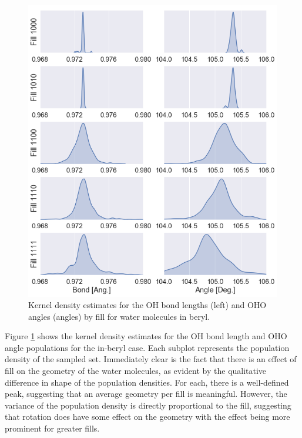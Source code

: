         \begin{figure}
            \centering
            \includegraphics[width=0.85\linewidth]{Figures/System/geom_kdes.png}
            \caption{Kernel density estimates for the OH bond lengths (left) and OHO angles (angles) by fill for water molecules in beryl. }
            \label{fig:geom_kdes}
        \end{figure}
        
        Figure \ref{fig:geom_kdes} shows the kernel density estimates for the OH bond length and OHO angle populations for the in-beryl case. Each subplot represents the population density of the sampled set. Immediately clear is the fact that there is an effect of fill on the geometry of the water molecules, as evident by the qualitative difference in shape of the population densities. For each, there is a well-defined peak, suggesting that an average geometry per fill is meaningful. However, the variance of the population density is directly proportional to the fill, suggesting that rotation does have some effect on the geometry with the effect being more prominent for greater fills. 
        
        
        
